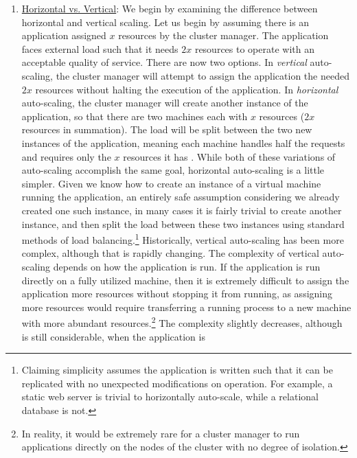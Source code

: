 \begin{enumerate}
  \item \underline{Horizontal vs. Vertical}: We begin by examining
    the difference between horizontal and vertical scaling.
    Let us begin by assuming there is an application assigned $x$ resources by the
    cluster manager. The application
    faces external load such that it needs $2x$ resources to operate with an
    acceptable quality of service. There are now two options. In
    \textit{vertical} auto-scaling, the cluster manager will attempt to assign
    the application the needed $2x$ resources
    without halting the execution of the application. In \textit{horizontal}
    auto-scaling, the cluster manager will create another instance of
    the application, so that there are two machines each with
    $x$ resources ($2x$ resources in summation). The load will be split between
    the two new instances of the application, meaning each machine handles half
    the requests and requires only the $x$ resources it has
    \cite{auto-scaling-techniques-for-elastic-applications-in-cloud-environments}. While
    both of these variations of auto-scaling accomplish the same goal, horizontal
    auto-scaling is a little simpler. Given we know how to create an instance of a
    virtual machine running the application, an entirely safe assumption
    considering we already created one such instance, in many cases it is
    fairly trivial to create
    another instance, and then split the load between these two instances using
    standard methods of load balancing.\footnote{Claiming
    simplicity assumes the application is written
    such that it can be replicated with no unexpected modifications
    on operation. For example, a static web server is trivial to horizontally
    auto-scale, while a relational database is not.}
    Historically, vertical auto-scaling has been more complex,
    although that is rapidly changing.
    The complexity of vertical auto-scaling depends on how the application
    is run. If the application is run directly on a fully utilized machine,
    then it is extremely difficult to assign the application more resources
    without stopping it from running, as assigning more resources
    would require transferring a running
    process to a new machine with more abundant resources.\footnote{In reality,
    it would be extremely rare for a cluster manager to run applications
    directly on the nodes of the cluster with no degree of isolation.} The complexity
    slightly decreases, although is still considerable, when the application is

\end{enumerate}
